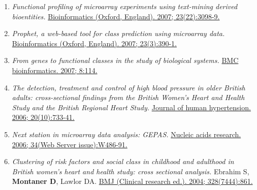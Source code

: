 \begin{enumerate}
\item
  \emph{Functional profiling of microarray experiments using text-mining
  derived bioentities.}
  \href{http://www.ncbi.nlm.nih.gov//pubmed/17855415}{Bioinformatics
  (Oxford, England). 2007; 23(22):3098-9.}

\item
  \emph{Prophet, a web-based tool for class prediction using microarray
  data.} 
  \href{http://www.ncbi.nlm.nih.gov//pubmed/17138587}{Bioinformatics
  (Oxford, England). 2007; 23(3):390-1.}

\item
  \emph{From genes to functional classes in the study of biological
  systems.} 
  \href{http://www.ncbi.nlm.nih.gov//pubmed/17407596}{BMC
  bioinformatics. 2007; 8:114.}


\item
  \emph{The detection, treatment and control of high blood pressure in
  older British adults: cross-sectional findings from the British
  Women's Heart and Health Study and the British Regional Heart Study.}
  \href{http://www.ncbi.nlm.nih.gov//pubmed/16855626}{Journal of human
  hypertension. 2006; 20(10):733-41.}

\item
  \emph{Next station in microarray data analysis: GEPAS.}
  \href{http://www.ncbi.nlm.nih.gov//pubmed/16845056}{Nucleic acids
  research. 2006; 34(Web Server issue):W486-91.}

\item
  \emph{Clustering of risk factors and social class in childhood and
  adulthood in British women's heart and health study: cross sectional
  analysis.} Ebrahim S, \textbf{Montaner D}, Lawlor DA.
  \href{http://www.ncbi.nlm.nih.gov//pubmed/15006898}{BMJ (Clinical
  research ed.). 2004; 328(7444):861.}

\end{enumerate}
